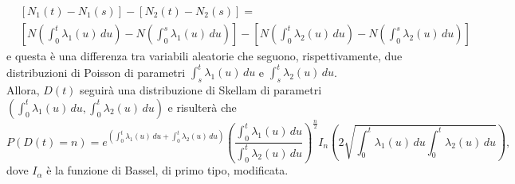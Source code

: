 \documentclass[12pt]{homework}
\begin{document}
\begin{enumerate}
\begin{align*}
  &[ N_{1}\left(t\right)-N_{1}\left(s\right)]-[N_{2}\left(t\right)-N_{2}\left(s\right)]=  \\
  &[N\left(\int_{0}^{t}\lambda_{1}\left(u\right) \,du\right) - N\left(\int_{0}^{s}\lambda_{1}\left(u\right) \,du \right)]-[N\left(\int_{0}^{t}\lambda_{2}\left(u\right) \,du\right) - N\left(\int_{0}^{s}\lambda_{2}\left(u\right) \,du \right)]
   \end{align*}
   e questa è una differenza tra variabili aleatorie che seguono, rispettivamente, due distribuzioni di Poisson di parametri $\int_{s}^{t}\lambda_{1}\left(u\right) \,du$ e $\int_{s}^{t}\lambda_{2}\left(u\right) \,du$.\\
   Allora, $D\left(t\right)$ seguirà una distribuzione di Skellam di parametri $\left(\int_{0}^{t}\lambda_{1}\left(u\right) \,du,\int_{0}^{t}\lambda_{2}\left(u\right) \,du \right)$ e risulterà che
   \begin{equation*}
   P\left(D\left(t\right)=n\right)=e^{\left(\int_{0}^{t}\lambda_{1}\left(u\right) \,du + \int_{0}^{t}\lambda_{2}\left(u\right) \,du \right)}\left(\frac{\int_{0}^{t}\lambda_{1}\left(u\right) \,du}{\int_{0}^{t}\lambda_{2}\left(u\right) \,du }\right)^{\frac{n}{2}}I_{n}\left(2\sqrt{\int_{0}^{t}\lambda_{1}\left(u\right) \,du \int_{0}^{t}\lambda_{2}\left(u\right) \,du}\right),
   \end{equation*}
   dove $I_{\alpha}$ è la funzione di Bassel, di primo tipo, modificata.
   

\end{enumerate}
\end{document}
